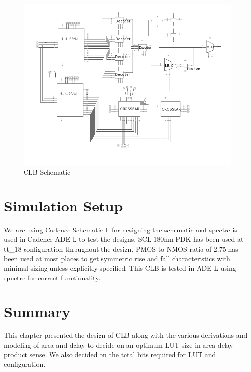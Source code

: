 \begin{figure}[H]
\centering
\includegraphics[width=\linewidth]{CLB_schematic.png}
\caption{CLB Schematic}
\label{fig:Figure}
\end{figure}




\section{Simulation Setup}
\paragraph{}

We are using Cadence Schematic L for designing the schematic and spectre is used in  Cadence ADE L to test the designs. SCL 180nm PDK has been used at tt\_18 configuration throughout the design. PMOS-to-NMOS ratio of 2.75 has been used at most places to get symmetric rise and fall characteristics with minimal sizing unless explicitly specified. This CLB is tested in ADE L using spectre for correct functionality.

\section{Summary}
\paragraph{}
This chapter presented the design of CLB along with the various derivations and modeling of area and delay to decide on an optimum LUT size in area-delay-product sense. We also decided on the total bits required for LUT and configuration.



